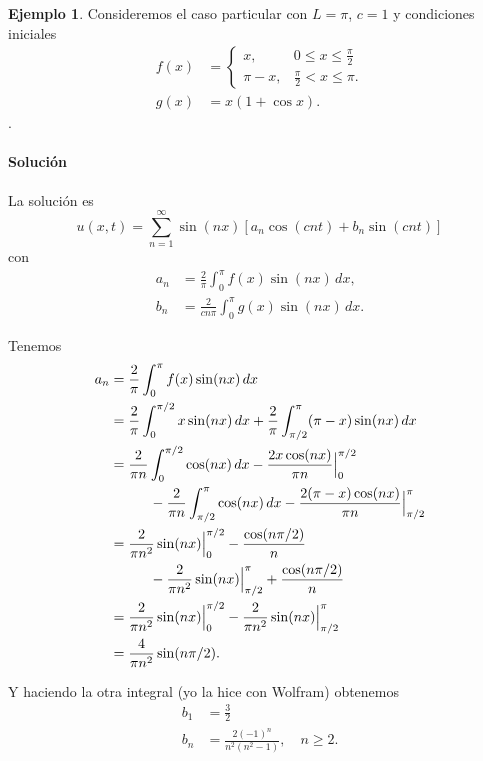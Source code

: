 \documentclass[11pt,letterpaper,draft]{report}
\theoremstyle{plain}
\theoremstyle{definition}
\newtheorem{example}[theorem]{Ejemplo}
\theoremstyle{remark}
\newcommand\<{\langle}
\renewcommand\>{\rangle}
\begin{document}
\begin{example}
  Consideremos el caso particular con $L=\pi$, $c=1$ y condiciones
  iniciales
  \begin{align*}
    f(x) &=
    \begin{cases}
      x, &0\leq x\leq \frac{\pi}{2} \\
      \pi-x, & \frac{\pi}{2}<x\leq\pi.
    \end{cases} \\
    g(x) &= x(1+\cos x).
  \end{align*}.

\paragraph{Solución}

  La solución es
  \[
    u(x,t)
    =
    \sum_{n=1}^{\infty}\sin(nx)
    \left[ a_n\cos(cnt) +b_n\sin(cnt) \right]
  \]
  con
  \begin{align*}
    a_n &= \frac{2}{\pi}\int_{0}^{\pi}f(x)\sin(nx)\,dx, \\
    b_n &= \frac{2}{cn\pi}\int_{0}^{\pi}g(x)\sin(nx)\,dx.
  \end{align*}

  Tenemos
  \begin{align*}
    a_n
    &= \frac{2}{\pi}\int_{0}^{\pi}f(x)\sin(nx)\,dx \\
    &= \frac{2}{\pi}\int_{0}^{\pi /2} x\sin(nx)\,dx
     + \frac{2}{\pi}\int_{\pi /2}^{\pi}(\pi-x)\sin(nx)\,dx \\
    &= \frac{2}{\pi n}\int_{0}^{\pi /2} \cos(nx)\,dx
      - \frac{2x\cos(nx)}{\pi n} \Big|_{0}^{\pi /2}
     \\ & \hspace{10mm}
     - \frac{2}{\pi n}\int_{\pi /2}^{\pi}\cos(nx)\,dx
     - \frac{2(\pi-x)\cos(nx)}{\pi n} \Big|_{\pi /2}^{\pi} \\
    &= \frac{2}{\pi n^2} \sin(nx) \Big|_{0}^{\pi /2}
      - \frac{\cos(n\pi /2)}{n}
     \\ & \hspace{10mm}
     - \frac{2}{\pi n^2}\sin(nx)\Big|_{\pi /2}^{\pi}
     + \frac{\cos(n\pi /2)}{n} \\
    &= \frac{2}{\pi n^2} \sin(nx) \Big|_{0}^{\pi /2}
     - \frac{2}{\pi n^2}\sin(nx)\Big|_{\pi /2}^{\pi} \\
    &= \frac{4}{\pi n^2}\sin(n\pi /2).
  \end{align*}

  Y haciendo la otra integral (yo la hice con Wolfram) obtenemos
  \begin{align*}
    b_1 &= \frac{3}{2} \\
    b_n
    &= \frac{2(-1)^n}{n^2(n^2-1)}, \quad n\geq 2.
  \end{align*}
\end{example}
\end{document}
